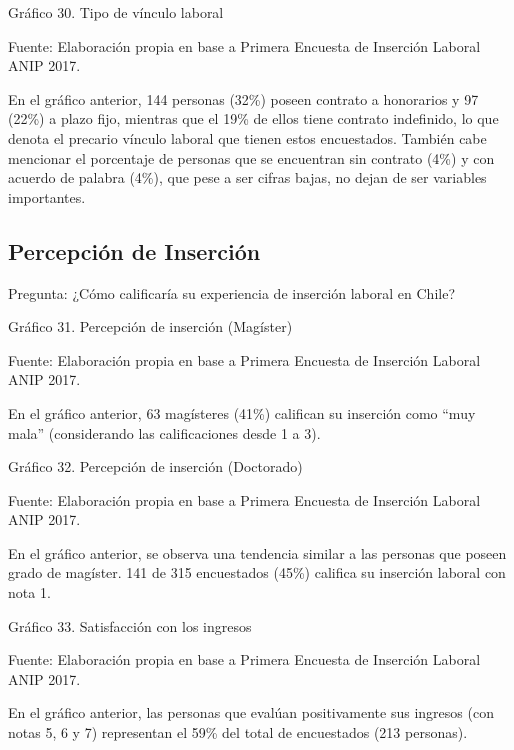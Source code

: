\documentclass{article}
\begin{document}
Gráfico 30. Tipo de vínculo laboral


Fuente: Elaboración propia en base a Primera Encuesta de Inserción Laboral ANIP 2017.

En el gráfico anterior, 144 personas (32\%) poseen contrato a honorarios y 97 (22\%) a plazo fijo, mientras que el 19\% de ellos tiene contrato indefinido, lo que denota el precario vínculo laboral que tienen estos encuestados. También cabe mencionar el porcentaje de personas que se encuentran sin contrato (4\%) y con acuerdo de palabra (4\%), que pese a ser cifras bajas, no dejan de ser variables importantes.

\subsection{Percepción de Inserción}

Pregunta: ¿Cómo calificaría su experiencia de inserción laboral en Chile?

Gráfico 31. Percepción de inserción (Magíster)


Fuente: Elaboración propia en base a Primera Encuesta de Inserción Laboral ANIP 2017.

En el gráfico anterior, 63 magísteres (41\%) califican su inserción como “muy mala” (considerando las calificaciones desde 1 a 3). 

Gráfico 32. Percepción de inserción (Doctorado)


Fuente: Elaboración propia en base a Primera Encuesta de Inserción Laboral ANIP 2017.

En el gráfico anterior, se observa una tendencia similar a las personas que poseen grado de magíster. 141 de 315 encuestados (45\%) califica su inserción laboral con nota 1.

Gráfico 33. Satisfacción con los ingresos


Fuente: Elaboración propia en base a Primera Encuesta de Inserción Laboral ANIP 2017.

En el gráfico anterior, las personas que evalúan positivamente sus ingresos (con notas 5, 6 y 7) representan el 59\% del total de encuestados (213 personas).
\end{document}
